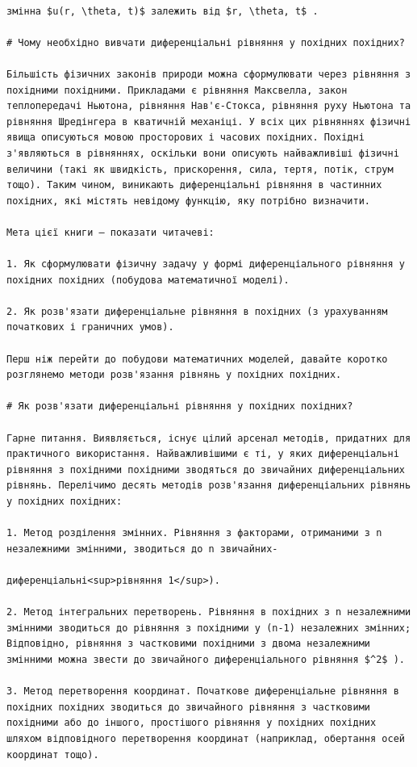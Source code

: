 \documentclass[
]{article}
\begin{document}
\begin{verbatim}

змінна $u(r, \theta, t)$ залежить від $r, \theta, t$ .

# Чому необхідно вивчати диференціальні рівняння у похідних похідних?

Більшість фізичних законів природи можна сформулювати через рівняння з похідними похідними. Прикладами є рівняння Максвелла, закон теплопередачі Ньютона, рівняння Нав'є-Стокса, рівняння руху Ньютона та рівняння Шредінгера в кватичній механіці. У всіх цих рівняннях фізичні явища описуються мовою просторових і часових похідних. Похідні з'являються в рівняннях, оскільки вони описують найважливіші фізичні величини (такі як швидкість, прискорення, сила, тертя, потік, струм тощо). Таким чином, виникають диференціальні рівняння в частинних похідних, які містять невідому функцію, яку потрібно визначити.

Мета цієї книги — показати читачеві:

1. Як сформулювати фізичну задачу у формі диференціального рівняння у похідних похідних (побудова математичної моделі).

2. Як розв'язати диференціальне рівняння в похідних (з урахуванням початкових і граничних умов).

Перш ніж перейти до побудови математичних моделей, давайте коротко розглянемо методи розв'язання рівнянь у похідних похідних.

# Як розв'язати диференціальні рівняння у похідних похідних?

Гарне питання. Виявляється, існує цілий арсенал методів, придатних для практичного використання. Найважливішими є ті, у яких диференціальні рівняння з похідними похідними зводяться до звичайних диференціальних рівнянь. Перелічимо десять методів розв'язання диференціальних рівнянь у похідних похідних:

1. Метод розділення змінних. Рівняння з факторами, отриманими з n незалежними змінними, зводиться до n звичайних-

диференціальні<sup>рівняння 1</sup>).

2. Метод інтегральних перетворень. Рівняння в похідних з n незалежними змінними зводиться до рівняння з похідними у (n-1) незалежних змінних; Відповідно, рівняння з частковими похідними з двома незалежними змінними можна звести до звичайного диференціального рівняння $^2$ ).

3. Метод перетворення координат. Початкове диференціальне рівняння в похідних похідних зводиться до звичайного рівняння з частковими похідними або до іншого, простішого рівняння у похідних похідних шляхом відповідного перетворення координат (наприклад, обертання осей координат тощо).


\end{verbatim}
\end{document}
